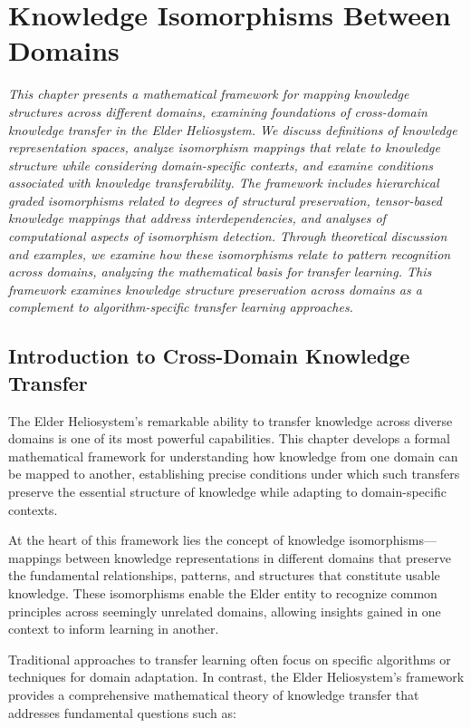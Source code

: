 \chapter{Knowledge Isomorphisms Between Domains}

\textit{This chapter presents a mathematical framework for mapping knowledge structures across different domains, examining foundations of cross-domain knowledge transfer in the Elder Heliosystem. We discuss definitions of knowledge representation spaces, analyze isomorphism mappings that relate to knowledge structure while considering domain-specific contexts, and examine conditions associated with knowledge transferability. The framework includes hierarchical graded isomorphisms related to degrees of structural preservation, tensor-based knowledge mappings that address interdependencies, and analyses of computational aspects of isomorphism detection. Through theoretical discussion and examples, we examine how these isomorphisms relate to pattern recognition across domains, analyzing the mathematical basis for transfer learning. This framework examines knowledge structure preservation across domains as a complement to algorithm-specific transfer learning approaches.}

\section{Introduction to Cross-Domain Knowledge Transfer}

The Elder Heliosystem's remarkable ability to transfer knowledge across diverse domains is one of its most powerful capabilities. This chapter develops a formal mathematical framework for understanding how knowledge from one domain can be mapped to another, establishing precise conditions under which such transfers preserve the essential structure of knowledge while adapting to domain-specific contexts.

At the heart of this framework lies the concept of knowledge isomorphisms—mappings between knowledge representations in different domains that preserve the fundamental relationships, patterns, and structures that constitute usable knowledge. These isomorphisms enable the Elder entity to recognize common principles across seemingly unrelated domains, allowing insights gained in one context to inform learning in another.

Traditional approaches to transfer learning often focus on specific algorithms or techniques for domain adaptation. In contrast, the Elder Heliosystem's framework provides a comprehensive mathematical theory of knowledge transfer that addresses fundamental questions such as:

